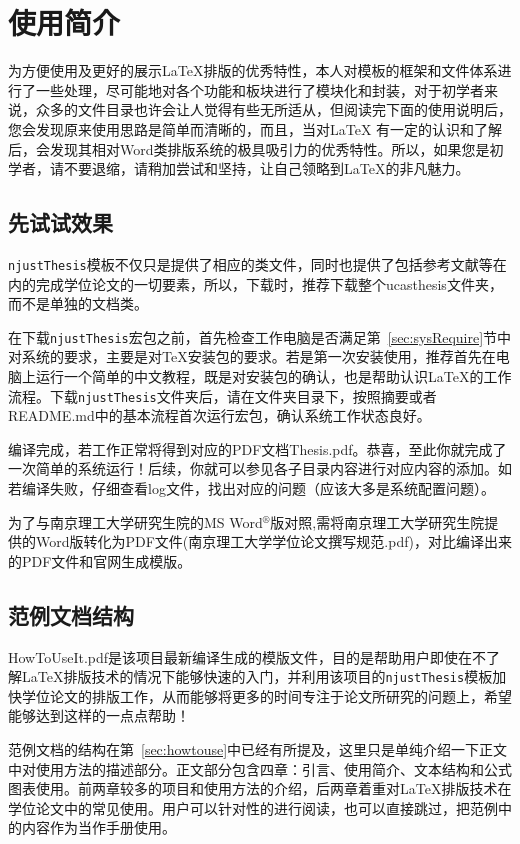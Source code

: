 
\chapter{使用简介}
\label{chap:guide}

为方便使用及更好的展示\LaTeX{}排版的优秀特性，本人对模板的框架和文件体系进行了一些处理，尽可能地对各个功能和板块进行了模块化和封装，对于初学者来说，众多的文件目录也许会让人觉得有些无所适从，但阅读完下面的使用说明后，您会发现原来使用思路是简单而清晰的，而且，当对\LaTeX{} 有一定的认识和了解后，会发现其相对Word类排版系统的极具吸引力的优秀特性。所以，如果您是初学者，请不要退缩，请稍加尝试和坚持，让自己领略到\LaTeX{}的非凡魅力。

\section{先试试效果}

\texttt{njustThesis}模板不仅只是提供了相应的类文件，同时也提供了包括参考文献等在内的完成学位论文的一切要素，所以，下载时，推荐下载整个ucasthesis文件夹，而不是单独的文档类。

在下载\texttt{njustThesis}宏包之前，首先检查工作电脑是否满足第~\ref{sec:sysRequire}节中对系统的要求，主要是对\TeX{}安装包的要求。若是第一次安装使用，推荐首先在电脑上运行一个简单的中文教程，既是对安装包的确认，也是帮助认识\LaTeX{}的工作流程。下载\texttt{njustThesis}文件夹后，请在文件夹目录下，按照摘要或者README.md中的基本流程首次运行宏包，确认系统工作状态良好。

编译完成，若工作正常将得到对应的PDF文档Thesis.pdf。恭喜，至此你就完成了一次简单的系统运行！后续，你就可以参见各子目录内容进行对应内容的添加。如若编译失败，仔细查看log文件，找出对应的问题（应该大多是系统配置问题）。

为了与南京理工大学研究生院的MS Word$^{\circledR}$版对照,需将南京理工大学研究生院提供的Word版转化为PDF文件(南京理工大学学位论文撰写规范.pdf)，对比编译出来的PDF文件和官网生成模版。

\section{范例文档结构}
\label{sec:example}

HowToUseIt.pdf是该项目最新编译生成的模版文件，目的是帮助用户即使在不了解\LaTeX{}排版技术的情况下能够快速的入门，并利用该项目的\texttt{njustThesis}模板加快学位论文的排版工作，从而能够将更多的时间专注于论文所研究的问题上，希望能够达到这样的一点点帮助！

范例文档的结构在第~\ref{sec:howtouse}中已经有所提及，这里只是单纯介绍一下正文中对使用方法的描述部分。正文部分包含四章：引言、使用简介、文本结构和公式图表使用。前两章较多的项目和使用方法的介绍，后两章着重对\LaTeX{}排版技术在学位论文中的常见使用。用户可以针对性的进行阅读，也可以直接跳过，把范例中的内容作为当作手册使用。





